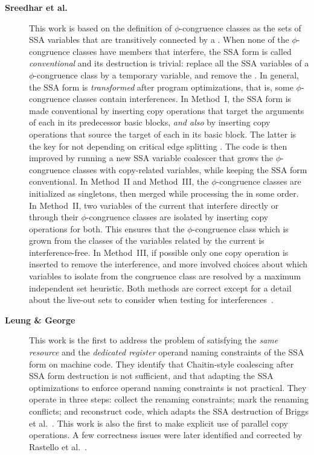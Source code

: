 \begin{description}
\item[\textbf{Sreedhar et al.~\cite{Sreedhar:1999:SAS}}] This work is based
on the definition of $\phi$-congruence classes as the sets of SSA variables that are transitively
connected by a \phifun. When none of the $\phi$-congruence classes have
members that interfere, the SSA form is called \emph{conventional} and its
destruction is trivial: replace all the SSA variables of a $\phi$-congruence
class by a temporary variable, and remove the \phifuns. In general, the
SSA form is \emph{transformed} after program optimizations, that is, some
$\phi$-congruence classes contain interferences.  In Method~I, the SSA form is
made conventional by inserting copy operations that target the arguments of each
\phifun in its predecessor basic blocks, \emph{and also} by inserting
copy operations that source the target of each \phifun in its basic
block. The latter is the key for not depending on critical edge splitting
\cite{boissinot09revisiting}. The code is then improved by running a new SSA
variable coalescer that grows the $\phi$-congruence classes with copy-related
variables, while keeping the SSA form conventional. In Method~II and Method~III, the
$\phi$-congruence classes are initialized as singletons, then merged while
processing the \phifuns in some order. In Method~II, two variables of
the current \phifun that interfere directly or through their
$\phi$-congruence classes are isolated by inserting copy operations for both.
This ensures that the $\phi$-congruence class which is grown from the classes of
the variables related by the current \phifun is interference-free. In
Method~III, if possible only one copy operation is inserted to remove the
interference, and more involved choices about which variables to isolate from
the \phifun congruence class are resolved by a maximum independent set
heuristic.  Both methods are correct except for a detail about the live-out sets
to consider when testing for interferences~\cite{boissinot09revisiting}.

\item[\textbf{Leung \& George~\cite{Leung:1999:PLDI}}] This work is the first to address the
problem of satisfying the \emph{same resource} and the \emph{dedicated register} operand
naming constraints of the SSA form on machine code. They identify that
Chaitin-style coalescing after SSA form destruction is not sufficient, and that
adapting the SSA optimizations to enforce operand naming constraints is not
practical.  They operate in three steps: collect the renaming constraints; mark
the renaming conflicts; and reconstruct code, which adapts the SSA destruction
of Briggs et al.~\cite{BriggsSSA}. This work is also the first to make
explicit use of parallel copy operations. A few correctness issues were later
identified and corrected by Rastello et al.~\cite{Rastello:2004:CGO}.


\end{description}
